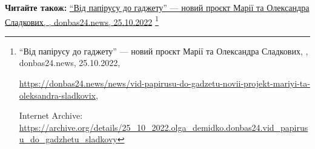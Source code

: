  
 
 
 
 

\def\pubIA{https://archive.org/details/25_10_2022.olga_demidko.donbas24.vid_papirusu_do_gadzhetu_sladkovy}
\def\pubTitle{\enquote{Від папірусу до гаджету} — новий проєкт Марії та Олександра Сладкових}
\def\pubDate{25.10.2022}
\def\pubOrigin{https://donbas24.news/news/vid-papirusu-do-gadzetu-novii-projekt-mariyi-ta-oleksandra-sladkovix}
\def\pubAuthor{\pubAuthorDemidko}
\def\pubSite{donbas24.news}

\textbf{Читайте також:} \href{\pubIA}{%
\pubTitle, \pubAuthor, \pubSite, \pubDate}%
\footnote{\pubTitle, \pubAuthor, \pubSite, \pubDate, \par\url{\pubOrigin}, \par Internet Archive: \url{\pubIA}}
